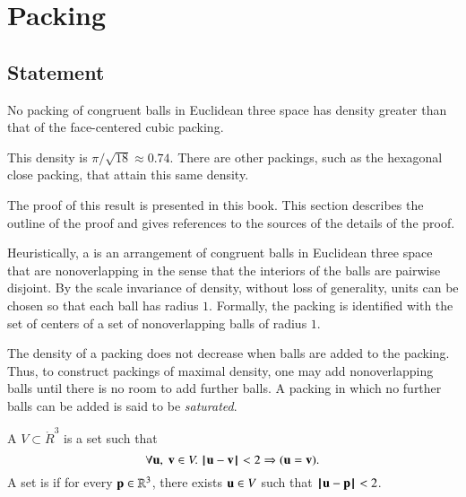 



\chapter{Packing}


\section{Statement}



\begin{theorem}
\label{theorem:kepler}   No packing of congruent balls in
Euclidean three space has density greater than that of the
face-centered cubic packing.
\end{theorem}

\begin{remark}
This density is $\pi/\sqrt{18}\approx 0.74.$  There are other
packings, such as the hexagonal close packing, that attain this
same density.
\end{remark}

The proof of this result is presented in this book. This section
describes the outline of the proof and gives references to
the sources of the details of the proof.

Heuristically, a  is an arrangement of congruent balls in Euclidean
three space that
are nonoverlapping in the sense that the interiors of the balls are
pairwise disjoint.  By the scale
invariance of density, 
without loss of generality, units can be chosen so that each ball has radius $1$.
Formally, the packing is identified with the set of centers of a set of nonoverlapping
balls of radius $1$.

The density of a packing does not
decrease when balls are added to the packing. Thus, to construct
packings of maximal density, one may add
nonoverlapping balls until there is no room to add further balls.
A packing in which no further balls can be added is said to be {\it saturated}.

\begin{definition}
A  $ V\subset \ring{R}^3$ is a set such that
\begin{displaymath}\forall  {\mathbf u},~{\mathbf v}\in  V.~  {\hskip0.1em|\hskip-0.15em|\hskip0.1em} {\mathbf u} - {\mathbf v}{\hskip0.1em|\hskip-0.15em|\hskip0.1em} < 2 \Rightarrow ( {\mathbf u}={\mathbf v}).\end{displaymath}
A set is  if for every ${\mathbf p}\in\mathbb{R}^3$,   there exists $ {\mathbf u}\in V$
such that ${\hskip0.1em|\hskip-0.15em|\hskip0.1em} {\mathbf u} - {\mathbf p}{\hskip0.1em|\hskip-0.15em|\hskip0.1em}< 2$.
\end{definition}
%
%


